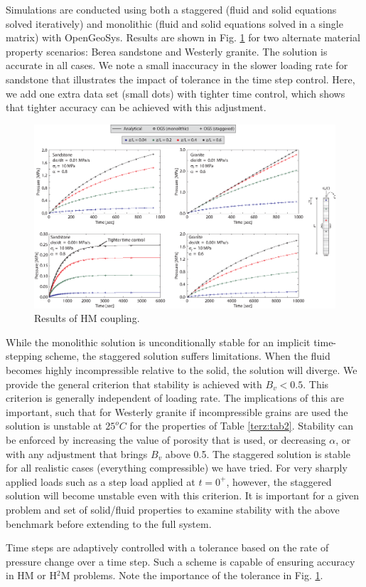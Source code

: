 Simulations are conducted using both a staggered (fluid and solid equations solved iteratively) and monolithic (fluid and solid equations solved in a single matrix) with OpenGeoSys. Results are shown in Fig. \ref{terz:res1} for two alternate material property scenarios: Berea sandstone and Westerly granite. The solution is accurate in all cases. We note a small inaccuracy in the slower loading rate for sandstone that illustrates the impact of tolerance in the time step control. Here, we add one extra data set (small dots) with tighter time control, which shows that tighter accuracy can be achieved with this adjustment.

\begin{figure}[!tbh]
\begin{center}
\includegraphics[width=1.0\textwidth]{chapter_14/figures/fig_14_1_2}
\end{center}
\caption{Results of HM coupling.}
\label{terz:res1}
\end{figure}

While the monolithic solution is unconditionally stable for an implicit time-stepping scheme, the staggered solution suffers limitations. When the fluid becomes highly incompressible relative to the solid, the solution will diverge. We provide the general criterion that stability is achieved with $B_v<0.5$. This criterion is generally independent of loading rate. The implications of this are important, such that for Westerly granite if incompressible grains are used the solution is unstable at $25 ^{o}C$ for the properties of Table \ref{terz:tab2}. Stability can be enforced by increasing the value of porosity that is used, or decreasing $\alpha $, or with any adjustment that brings $B_v$ above 0.5. The staggered solution is stable for all realistic cases (everything compressible) we have tried. For very sharply applied loads such as a step load applied at $t=0^+$, however, the staggered solution will become unstable even with this criterion. It is important for a given problem and set of solid/fluid properties to examine stability with the above benchmark before extending to the full system.

Time steps are adaptively controlled with a tolerance based on the rate of pressure change over a time step. Such a scheme is capable of ensuring accuracy in HM or H$^2$M problems. Note the importance of the tolerance in Fig. \ref{terz:res1}.